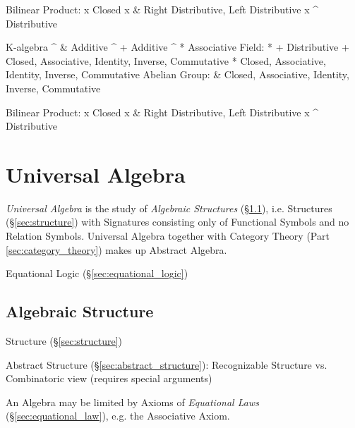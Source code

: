             Bilinear
            Product:
                      x Closed
                    x & Right Distributive, Left Distributive
                    x ^ Distributive

    K-algebra
                    ^ & Additive
                    ^ + Additive
                    ^ * Associative
             Field: * + Distributive
                      + Closed, Associative, Identity, Inverse, Commutative
                      * Closed, Associative, Identity, Inverse, Commutative
            Abelian
             Group:   & Closed, Associative, Identity, Inverse, Commutative

            Bilinear
            Product:
                      x Closed
                    x & Right Distributive, Left Distributive
                    x ^ Distributive


\fi


\section{Universal Algebra}\label{sec:universal_algebra}

\emph{Universal Algebra} is the study of \emph{Algebraic Structures}
(\S\ref{sec:algebraic_structure}), i.e. Structures
(\S\ref{sec:structure}) with Signatures consisting only of Functional
Symbols and no Relation Symbols. Universal Algebra together with
Category Theory (Part \ref{sec:category_theory}) makes up Abstract
Algebra.

Equational Logic (\S\ref{sec:equational_logic})



\subsection{Algebraic Structure}\label{sec:algebraic_structure}

Structure (\S\ref{sec:structure})

Abstract Structure (\S\ref{sec:abstract_structure}): Recognizable
Structure vs. Combinatoric view (requires special arguments)

An Algebra may be limited by Axioms of \emph{Equational Laws}
(\S\ref{sec:equational_law}), e.g. the Associative Axiom.

